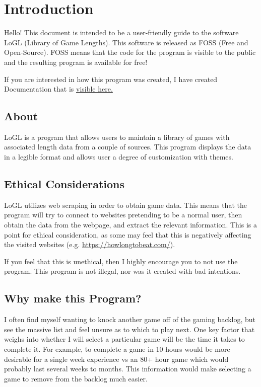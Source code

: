 \section{Introduction}

Hello! This document is intended to be a user-friendly guide to the
software LoGL (Library of Game Lengths). This software is released as
FOSS (Free and Open-Source).
FOSS means that the code for the program is visible to
the public and the resulting program is available for free!

If you are interested in how this program was created, I have created
Documentation that is
\href{https://github.com/EZRA-DVLPR/GameList/blob/main/docs/PDF/Documentation.pdf}{visible
here.}

\subsection{About}

LoGL is a program that allows users to maintain a library of games
with associated length data from a couple of sources. This program
displays the data in a legible format and allows user a degree of
customization with themes.

\subsection{Ethical Considerations}

LoGL utilizes web scraping in order to obtain game data. This means
that the program will try to connect to websites pretending to be a
normal user, then obtain the data from the webpage, and extract the
relevant information. This is a point for ethical consideration, as
some may feel that this is negatively affecting the visited
websites (e.g. \href{https://howlongtobeat.com/}{https://howlongtobeat.com/}).

If you feel that this is unethical, then I highly encourage you to
not use the program. This program is not illegal, nor was it created
with bad intentions.

\subsection{Why make this Program?}

I often find myself wanting to knock another game off of the gaming
backlog, but see the massive list and feel unsure as to which to play
next. One key factor that weighs into whether I will select a
particular game will be the time it takes to complete it. For
example, to complete a game in 10 hours would be more desirable for a
single week experience vs an 80+ hour game which would probably last
several weeks to months. This information would make selecting a game
to remove from the backlog much easier.

